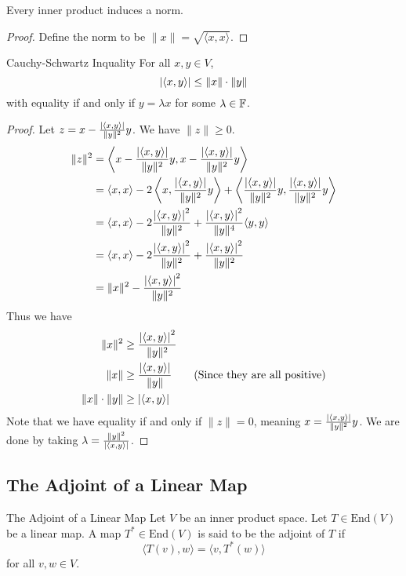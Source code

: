\documentclass[a4paper]{article}
\begin{document}
\begin{prp}{}{} Every inner product induces a norm. \tcbline
\begin{proof} Define the norm to be $\|x\|=\sqrt{\langle x,x\rangle}$. 
\end{proof}
\end{prp}

\begin{prp}{Cauchy-Schwartz Inquality}{} For all $x,y\in V$, $$\abs{\langle x,y\rangle}\leq\|x\|\cdot\|y\|$$ with equality if and only if $y=\lambda x$ for some $\lambda\in\mathbb{F}$. 
\begin{proof} Let $z=x-\frac{\abs{\langle x,y\rangle}}{\|y\|^2}y$. We have $\|z\|\geq0$. 
\begin{align*}
\|z\|^2&=\left\langle x-\frac{\abs{\langle x,y\rangle}}{\|y\|^2}y,x-\frac{\abs{\langle x,y\rangle}}{\|y\|^2}y\right\rangle\\
&=\langle x,x\rangle-2\left\langle x,\frac{\abs{\langle x,y\rangle}}{\|y\|^2}y\right\rangle+\left\langle \frac{\abs{\langle x,y\rangle}}{\|y\|^2}y,\frac{\abs{\langle x,y\rangle}}{\|y\|^2}y\right\rangle\\
&=\langle x,x\rangle-2\frac{\abs{\langle x,y\rangle}^2}{\|y\|^2}+\frac{\abs{\langle x,y\rangle}^2}{\|y\|^4}\langle y,y\rangle\\
&=\langle x,x\rangle-2\frac{\abs{\langle x,y\rangle}^2}{\|y\|^2}+\frac{\abs{\langle x,y\rangle}^2}{\|y\|^2}\\
&=\|x\|^2-\frac{\abs{\langle x,y\rangle}^2}{\|y\|^2}\\
\end{align*}
Thus we have
\begin{align*}
\|x\|^2&\geq\frac{\abs{\langle x,y\rangle}^2}{\|y\|^2}\\
\|x\|&\geq\frac{\abs{\langle x,y\rangle}}{\|y\|}\tag{Since they are all positive}\\
\|x\|\cdot\|y\|&\geq\abs{\langle x,y\rangle}
\end{align*}
Note that we have equality if and only if $\|z\|=0$, meaning $x=\frac{\abs{\langle x,y\rangle}}{\|y\|^2}y$. We are done by taking $\lambda=\frac{\|y\|^2}{\abs{\langle x,y\rangle}}$. 
\end{proof}
\end{prp}
\subsection{The Adjoint of a Linear Map}
\begin{defn}{The Adjoint of a Linear Map}{} Let $V$ be an inner product space. Let $T\in\text{End}(V)$ be a linear map. A map $T^\ast\in\text{End}(V)$ is said to be the adjoint of $T$ if $$\langle T(v), w\rangle=\langle v, T^\ast(w)\rangle$$ for all $v,w\in V$. 
\end{defn}
\end{document}
